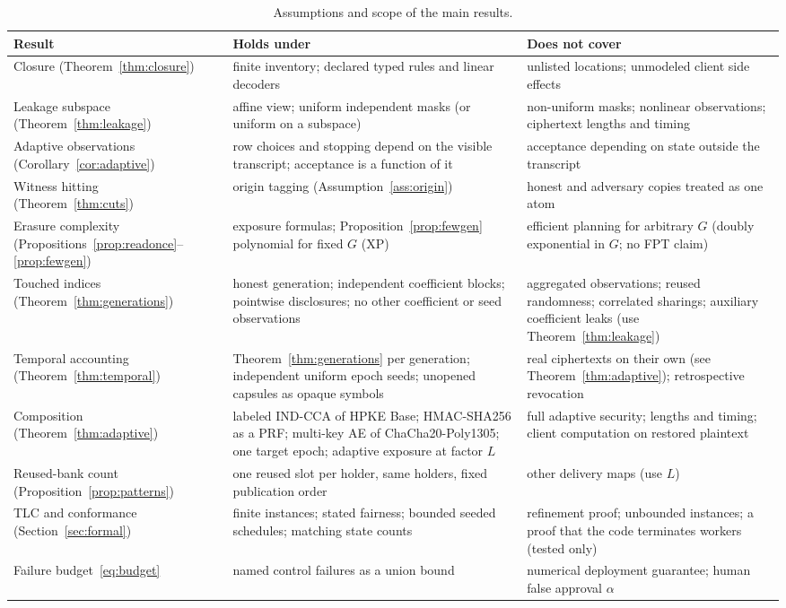 \documentclass[pdflatex,sn-mathphys-num]{sn-jnl}%
\theoremstyle{plain}
\theoremstyle{definition}
\begin{document}
\begin{table}[t]
\caption{Assumptions and scope of the main results.}\label{tab:scope}
\centering\footnotesize
\begin{tabularx}{\linewidth}{@{}>{\raggedright\arraybackslash}p{.20\linewidth}YY@{}}\toprule
Result & Holds under & Does not cover\\\midrule
Closure (Theorem~\ref{thm:closure}) & finite inventory; declared typed rules and linear decoders & unlisted locations; unmodeled client side effects\\
Leakage subspace (Theorem~\ref{thm:leakage}) & affine view; uniform independent masks (or uniform on a subspace) & non-uniform masks; nonlinear observations; ciphertext lengths and timing\\
Adaptive observations (Corollary~\ref{cor:adaptive}) & row choices and stopping depend on the visible transcript; acceptance is a function of it & acceptance depending on state outside the transcript\\
Witness hitting (Theorem~\ref{thm:cuts}) & origin tagging (Assumption~\ref{ass:origin}) & honest and adversary copies treated as one atom\\
Erasure complexity (Propositions~\ref{prop:readonce}--\ref{prop:fewgen}) & exposure formulas; Proposition~\ref{prop:fewgen} polynomial for fixed $G$ (XP) & efficient planning for arbitrary $G$ (doubly exponential in $G$; no FPT claim)\\
Touched indices (Theorem~\ref{thm:generations}) & honest generation; independent coefficient blocks; pointwise disclosures; no other coefficient or seed observations & aggregated observations; reused randomness; correlated sharings; auxiliary coefficient leaks (use Theorem~\ref{thm:leakage})\\
Temporal accounting (Theorem~\ref{thm:temporal}) & Theorem~\ref{thm:generations} per generation; independent uniform epoch seeds; unopened capsules as opaque symbols & real ciphertexts on their own (see Theorem~\ref{thm:adaptive}); retrospective revocation\\
Composition (Theorem~\ref{thm:adaptive}) & labeled IND-CCA of HPKE Base; HMAC-SHA256 as a PRF; multi-key AE of ChaCha20-Poly1305; one target epoch; adaptive exposure at factor $L$ & full adaptive security; lengths and timing; client computation on restored plaintext\\
Reused-bank count (Proposition~\ref{prop:patterns}) & one reused slot per holder, same holders, fixed publication order & other delivery maps (use $L$)\\
TLC and conformance (Section~\ref{sec:formal}) & finite instances; stated fairness; bounded seeded schedules; matching state counts & refinement proof; unbounded instances; a proof that the code terminates workers (tested only)\\
Failure budget~\eqref{eq:budget} & named control failures as a union bound & numerical deployment guarantee; human false approval $\alpha$\\\bottomrule
\end{tabularx}
\end{table}
\end{document}
